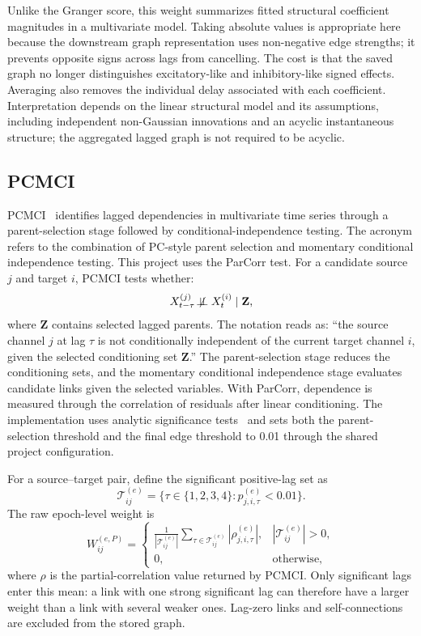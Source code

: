 \documentclass[11pt,a4paper]{article}
\begin{document}
Unlike the Granger score, this weight summarizes fitted structural
coefficient magnitudes in a multivariate model. Taking absolute values is
appropriate here because the downstream graph representation uses
non-negative edge strengths; it prevents opposite signs across lags from
cancelling. The cost is that the saved graph no longer distinguishes
excitatory-like and inhibitory-like signed effects. Averaging also removes
the individual delay associated with each coefficient. Interpretation depends
on the linear structural model and its assumptions, including independent
non-Gaussian innovations and an acyclic instantaneous structure; the
aggregated lagged graph is not required to be acyclic.

\subsection{PCMCI}

PCMCI~\cite{runge2019} identifies lagged dependencies in multivariate time
series through a parent-selection stage followed by conditional-independence
testing. The acronym refers to the combination of PC-style parent selection
and momentary conditional independence testing. This project uses the ParCorr
test. For a candidate source $j$ and target $i$, PCMCI tests whether:
\[
    X_{t-\tau}^{(j)}
    \not\!\perp\!\!\!\perp
    X_t^{(i)}
    \mid \mathbf{Z},
\]
where $\mathbf{Z}$ contains selected lagged parents. The notation reads as:
``the source channel $j$ at lag $\tau$ is not conditionally independent of
the current target channel $i$, given the selected conditioning set
$\mathbf{Z}$.'' The parent-selection stage reduces the conditioning sets, and
the momentary conditional independence stage evaluates candidate links given
the selected variables. With ParCorr, dependence is measured through the
correlation of residuals after linear conditioning. The implementation uses
analytic significance tests~\cite{tigramitedocs} and sets both the
parent-selection threshold and the final edge threshold to 0.01 through the
shared project configuration.

For a source--target pair, define the significant positive-lag set as
\[
    \mathcal T_{ij}^{(e)}=
    \{\tau\in\{1,2,3,4\}:p_{j,i,\tau}^{(e)}<0.01\}.
\]
The raw epoch-level weight is
\[
    W_{ij}^{(e,P)}=
    \begin{cases}
    \displaystyle\frac{1}{|\mathcal T_{ij}^{(e)}|}
    \sum_{\tau\in\mathcal T_{ij}^{(e)}}
    |\rho_{j,i,\tau}^{(e)}|, & |\mathcal T_{ij}^{(e)}|>0,\\
    0, & \text{otherwise},
    \end{cases}
\]
where $\rho$ is the partial-correlation value returned by PCMCI. Only
significant lags enter this mean: a link with one strong significant lag
can therefore have a larger weight than a link with several weaker ones.
Lag-zero links and self-connections are excluded from the stored graph.
\end{document}
